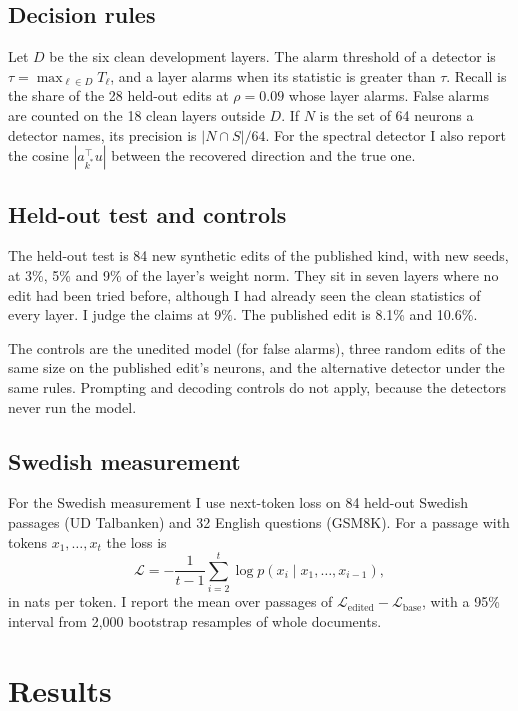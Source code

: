 \documentclass[11pt,a4paper]{article}
\begin{document}
\subsection{Decision rules}

Let $D$ be the six clean development layers. The alarm threshold of a detector is
$\tau = \max_{\ell \in D} T_\ell$, and a layer alarms when its statistic is greater than $\tau$.
Recall is the share of the 28 held-out edits at $\rho = 0.09$ whose layer alarms. False alarms are
counted on the 18 clean layers outside $D$. If $N$ is the set of 64 neurons a detector names, its
precision is $|N \cap S| / 64$. For the spectral detector I also report the cosine
$|a_{k^\ast}^\top u|$ between the recovered direction and the true one.

\subsection{Held-out test and controls}

The held-out test is 84 new synthetic edits of the published kind, with new seeds, at 3\%, 5\% and
9\% of the layer's weight norm. They sit in seven layers where no edit had been tried before,
although I had already seen the clean statistics of every layer. I judge the claims at 9\%. The
published edit is 8.1\% and 10.6\%.

The controls are the unedited model (for false alarms), three random edits of the same size on the
published edit's neurons, and the alternative detector under the same rules. Prompting and decoding
controls do not apply, because the detectors never run the model.

\subsection{Swedish measurement}

For the Swedish measurement I use next-token loss on 84 held-out Swedish passages (UD Talbanken)
and 32 English questions (GSM8K). For a passage with tokens $x_1, \dots, x_t$ the loss is
\[
  \mathcal{L} = -\frac{1}{t-1} \sum_{i=2}^{t} \log p(x_i \mid x_1, \dots, x_{i-1}) ,
\]
in nats per token. I report the mean over passages of
$\mathcal{L}_{\mathrm{edited}} - \mathcal{L}_{\mathrm{base}}$, with a 95\% interval from 2{,}000
bootstrap resamples of whole documents.

\section{Results}
\end{document}
